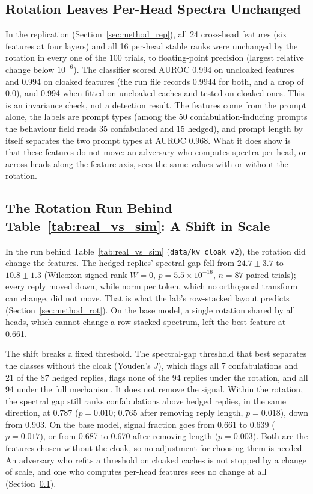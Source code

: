 \subsection{Rotation Leaves Per-Head Spectra Unchanged}
\label{sec:replication}

In the replication (Section~\ref{sec:method_rep}), all 24 cross-head
features (six features at four layers) and all 16 per-head stable ranks
were unchanged by the rotation in every one of the 100 trials, to
floating-point precision (largest relative change below $10^{-6}$). The
classifier scored AUROC 0.994 on uncloaked features and 0.994 on cloaked
features (the run file records 0.9944 for both, and a drop of 0.0), and
0.994 when fitted on uncloaked caches and tested on cloaked ones. This is
an invariance check, not a detection result. The features come from the
prompt alone, the labels are prompt types (among the 50
confabulation-inducing prompts the behaviour field reads 35 confabulated
and 15 hedged), and prompt length by itself separates the two prompt
types at AUROC 0.968. What it does show is that these features do not
move: an adversary who computes spectra per head, or across heads along
the feature axis, sees the same values with or without the rotation.

\subsection{\texorpdfstring{The Rotation Run Behind Table~\ref{tab:real_vs_sim}: A Shift in Scale}{The Rotation Run Behind Table 2: A Shift in Scale}}
\label{sec:shift}

In the run behind Table~\ref{tab:real_vs_sim} (\texttt{data/kv\_cloak\_v2}),
the rotation did change the features. The hedged replies' spectral gap
fell from $24.7 \pm 3.7$ to $10.8 \pm 1.3$ (Wilcoxon signed-rank $W = 0$,
$p = 5.5 \times 10^{-16}$, $n = 87$ paired trials); every reply moved
down, while norm per token, which no orthogonal transform can change, did
not move. That is what the lab's row-stacked layout predicts
(Section~\ref{sec:method_rot}). On the base model, a single rotation
shared by all heads, which cannot change a row-stacked spectrum, left the
best feature at 0.661.

The shift breaks a fixed threshold. The spectral-gap threshold that best
separates the classes without the cloak (Youden's $J$), which flags all 7
confabulations and 21 of the 87 hedged replies, flags none of the 94
replies under the rotation, and all 94 under the full mechanism. It does
not remove the signal. Within the rotation, the spectral gap still ranks
confabulations above hedged replies, in the same direction, at 0.787
($p = 0.010$; 0.765 after removing reply length, $p = 0.018$), down from
0.903. On the base model, signal fraction goes from 0.661 to 0.639
($p = 0.017$), or from 0.687 to 0.670 after removing length
($p = 0.003$). Both are the features chosen without the cloak, so no
adjustment for choosing them is needed. An adversary who refits a
threshold on cloaked caches is not stopped by a change of scale, and one
who computes per-head features sees no change at all
(Section~\ref{sec:replication}).

